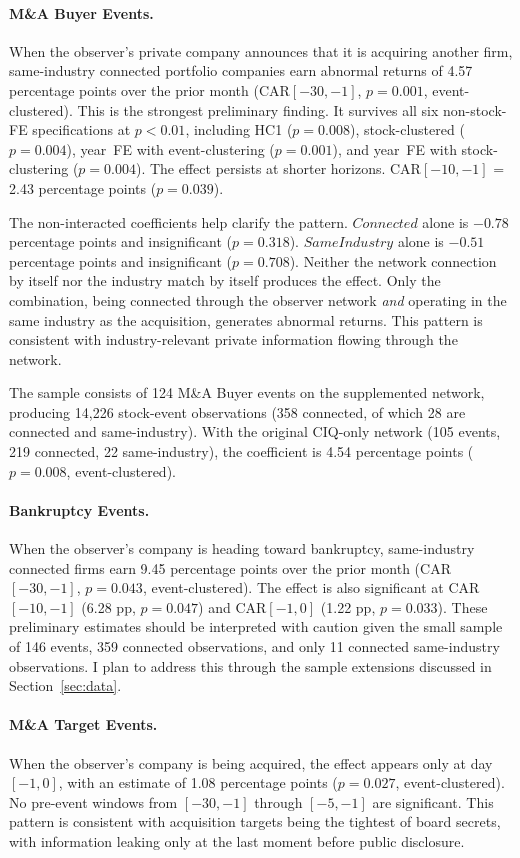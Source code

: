 \paragraph{M\&A Buyer Events.} When the observer's private company announces that it is acquiring another firm, same-industry connected portfolio companies earn abnormal returns of 4.57 percentage points over the prior month (CAR$[-30,-1]$, $p=0.001$, event-clustered). This is the strongest preliminary finding. It survives all six non-stock-FE specifications at $p<0.01$, including HC1 ($p=0.008$), stock-clustered ($p=0.004$), year~FE with event-clustering ($p=0.001$), and year~FE with stock-clustering ($p=0.004$). The effect persists at shorter horizons. CAR$[-10,-1]$ = 2.43 percentage points ($p=0.039$).

The non-interacted coefficients help clarify the pattern. $Connected$ alone is $-0.78$ percentage points and insignificant ($p=0.318$). $SameIndustry$ alone is $-0.51$ percentage points and insignificant ($p=0.708$). Neither the network connection by itself nor the industry match by itself produces the effect. Only the combination, being connected through the observer network \textit{and} operating in the same industry as the acquisition, generates abnormal returns. This pattern is consistent with industry-relevant private information flowing through the network.

The sample consists of 124 M\&A Buyer events on the supplemented network, producing 14,226 stock-event observations (358 connected, of which 28 are connected and same-industry). With the original CIQ-only network (105 events, 219 connected, 22 same-industry), the coefficient is 4.54 percentage points ($p=0.008$, event-clustered).

\paragraph{Bankruptcy Events.} When the observer's company is heading toward bankruptcy, same-industry connected firms earn 9.45 percentage points over the prior month (CAR$[-30,-1]$, $p=0.043$, event-clustered). The effect is also significant at CAR$[-10,-1]$ (6.28 pp, $p=0.047$) and CAR$[-1,0]$ (1.22 pp, $p=0.033$). These preliminary estimates should be interpreted with caution given the small sample of 146 events, 359 connected observations, and only 11 connected same-industry observations. I plan to address this through the sample extensions discussed in Section~\ref{sec:data}.

\paragraph{M\&A Target Events.} When the observer's company is being acquired, the effect appears only at day $[-1,0]$, with an estimate of 1.08 percentage points ($p=0.027$, event-clustered). No pre-event windows from $[-30,-1]$ through $[-5,-1]$ are significant. This pattern is consistent with acquisition targets being the tightest of board secrets, with information leaking only at the last moment before public disclosure.

